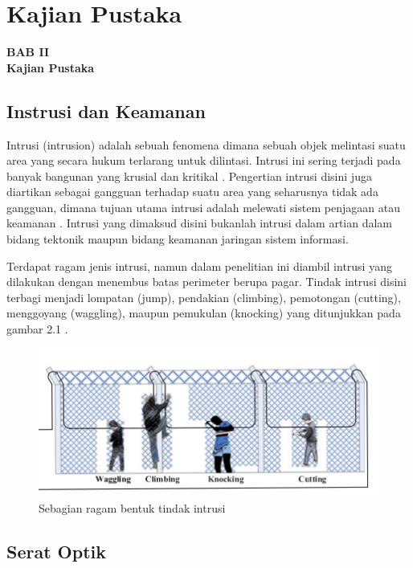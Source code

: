 \documentclass[12pt]{article}
\begin{document}
\newpage

	\section{Kajian Pustaka}
	
	\begin{center}
		{\large \textbf{BAB II}} \\
		{\large \textbf{Kajian Pustaka}}
	\end{center}

	\subsection{Instrusi dan Keamanan}
	
	Intrusi (intrusion) adalah sebuah fenomena dimana sebuah objek melintasi suatu area yang secara hukum terlarang untuk dilintasi.
	Intrusi ini sering terjadi pada banyak bangunan yang krusial dan kritikal \cite{Quwaider2017}.
	Pengertian intrusi disini juga diartikan sebagai gangguan terhadap suatu area yang seharusnya tidak ada gangguan, dimana tujuan utama intrusi adalah melewati sistem penjagaan atau keamanan \cite{Chapman}.
	Intrusi yang dimaksud disini bukanlah intrusi dalam artian dalam bidang tektonik maupun bidang keamanan jaringan sistem informasi.
	
	Terdapat ragam jenis intrusi, namun dalam penelitian ini diambil intrusi yang dilakukan dengan menembus batas perimeter berupa pagar.
	Tindak intrusi disini terbagi menjadi lompatan (jump), pendakian (climbing), pemotongan (cutting), menggoyang (waggling), maupun pemukulan (knocking) yang ditunjukkan pada gambar 2.1 \cite{Huang2017}.

	\begin{figure}[!ht]
		\centering
		\captionsetup{justification=centering}
   		\includegraphics[width=0.7\linewidth]{images/Bab_2/Bab_2_1}
		\caption[Ragam Intrusi]{\small{Sebagian ragam bentuk tindak intrusi}}
	\end{figure}

	\subsection{Serat Optik}
	
\end{document}
